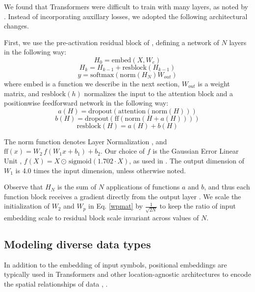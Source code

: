\documentclass{article}
\begin{document}
We found that Transformers were difficult to train with many layers, as noted by \cite{al2018character}. Instead of incorporating auxillary losses, we adopted the following architectural changes.

First, we use the pre-activation residual block of \cite{He2016}, defining a network of $N$ layers in the following way:
\begin{equation}H_0 = \mathrm{embed}(X, W_e)\end{equation}
\begin{equation}H_k = H_{k-1} + \mathrm{resblock}(H_{k-1})\end{equation}
\begin{equation}y = \mathrm{softmax}(\mathrm{norm}(H_N) W_{out})\end{equation}
where $\mathrm{embed}$ is a function we describe in the next section, $W_{out}$ is a weight matrix, and $\mathrm{resblock}(h)$ normalizes the input to the attention block and a positionwise feedforward network in the following way:
\begin{equation}a(H) = \mathrm{dropout}(\mathrm{attention}(\mathrm{norm}(H)))\end{equation}
\begin{equation}b(H) = \mathrm{dropout}(\mathrm{ff}(\mathrm{norm}(H + a(H))))\end{equation}
\begin{equation}\mathrm{resblock}(H) = a(H) + b(H) \end{equation}

The $\mathrm{norm}$ function denotes Layer Normalization \cite{ba2016layer}, and $\mathrm{ff}(x) = W_2 \, f(W_1x + b_1) + b_2$. Our choice of $f$ is the Gaussian Error Linear Unit \cite{hendrycks2016bridging}, $f(X) = X \odot \, \mathrm{sigmoid}(1.702 \cdot X)$, as used in \cite{radford2018}. The output dimension of $W_1$ is 4.0 times the input dimension, unless otherwise noted.

Observe that $H_N$ is the sum of $N$ applications of functions $a$ and $b$, and thus each function block receives a gradient directly from the output layer . We scale the initialization of $W_2$ and $W_p$ in Eq. \ref{wpmat} by $\frac{1}{\sqrt{2N}}$ to keep the ratio of input embedding scale to residual block scale invariant across values of $N$. 

\subsection{Modeling diverse data types}
In addition to the embedding of input symbols, positional embeddings are typically used in Transformers and other location-agnostic architectures to encode the spatial relationships of data \cite{gehring2017convolutional}, \cite{parmar2018image}.
\end{document}
